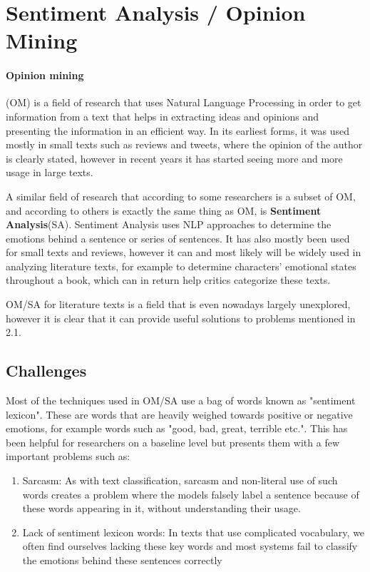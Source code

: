 \documentclass{article}
\begin{document}
	\section{Sentiment Analysis / Opinion Mining}
	
	\paragraph{Opinion mining}(OM) is a field of research that uses Natural Language Processing in order to get information from a text that helps in extracting ideas and opinions and presenting the information in an efficient way\cite{pakistan}. In its earliest forms, it was used mostly in small texts such as reviews and tweets, where the opinion of the author is clearly stated, however in recent years it has started seeing more and more usage in large texts. 
	
	A similar field of research that according to some researchers is a subset of OM, and according to others is exactly the same thing as OM\cite{kaur}, is \textbf{Sentiment Analysis}(SA). Sentiment Analysis uses NLP approaches to determine the emotions behind a sentence or series of sentences. It has also mostly been used for small texts and reviews\cite{sergio}, however it can and most likely will be widely used in analyzing literature texts, for example to determine characters' emotional states throughout a book, which can in return help critics categorize these texts. \par
	
	OM/SA for literature texts is a field that is even nowadays largely unexplored, however it is clear that it can provide useful solutions to problems mentioned in 2.1.
	
	
	\subsection{Challenges}
	
	Most of the techniques used in OM/SA use a bag of words known as "sentiment lexicon". These are words that are heavily weighed towards positive or negative emotions, for example words such as "good, bad, great, terrible etc."\cite{shelly}. This has been helpful for researchers on a baseline level but presents them with a few important problems such as:
	
	\begin{enumerate}
		\item Sarcasm: As with text classification, sarcasm and non-literal use of such words creates a problem where the models falsely label a sentence because of these words appearing in it, without understanding their usage.
		
		\item Lack of sentiment lexicon words: In texts that use complicated vocabulary, we often find ourselves lacking these key words and most systems fail to classify the emotions behind these sentences correctly
	\end{enumerate}
\end{document}
